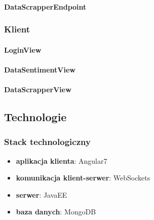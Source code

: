 \paragraph*{DataScrapperEndpoint}
\subsubsection{Klient}

\paragraph*{LoginView}
\paragraph*{DataSentimentView}
\paragraph*{DataScrapperView}

\subsection{Technologie}
\subsubsection{Stack technologiczny}
\begin{itemize}
  \item {\textbf{aplikacja klienta}: Angular7}
  \item {\textbf{komunikacja klient-serwer}: WebSockets}
  \item {\textbf{serwer}: JavaEE}
  \item {\textbf{baza danych}: MongoDB}
\end{itemize}
\clearpage
